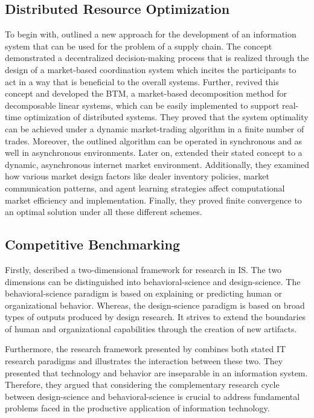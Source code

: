 \subsection{Distributed Resource Optimization}
\label{sec:Distributed Resource Optimization}
To begin with,  outlined a new approach for the 
development of an information system
that can be used for the problem of a supply chain. The concept demonstrated a decentralized
decision-making process that is realized through the design of a market-based coordination
system which incites the participants to act in a way that is beneficial to the overall
systems. Further,  revived this concept
and developed the BTM, a market-based decomposition method for decomposable linear systems,
which can be easily implemented to support real-time optimization of distributed
systems. They proved that the system optimality can be
achieved under a dynamic market-trading algorithm in a finite number of trades.
Moreover, the outlined algorithm can be operated in synchronous and as well in
asynchronous environments. Later on,  extended 
their stated concept to a dynamic, asynchronous internet market environment.
Additionally, they examined how various market design factors like dealer inventory
policies, market communication patterns, and agent learning strategies affect
computational market efficiency and implementation. Finally,
they proved finite convergence to an optimal solution under all these different schemes.

\subsection{Competitive Benchmarking}
Firstly,  described a two-dimensional framework for research in IS.
The two dimensions can be distinguished into behavioral-science and design-science. The behavioral-science
paradigm is based on explaining or predicting human or organizational behavior. Whereas, the design-science
paradigm is based on broad types of outputs produced by design research. It strives to extend the boundaries
of human and organizational capabilities through the creation of new artifacts.

Furthermore, the research framework presented by  combines both stated
IT research paradigms and illustrates the interaction between these two.
They presented that technology and behavior are inseparable in an information system. Therefore,
they argued that considering the complementary research cycle between design-science and behavioral-science
is crucial to address fundamental problems faced in the productive application of information technology.

